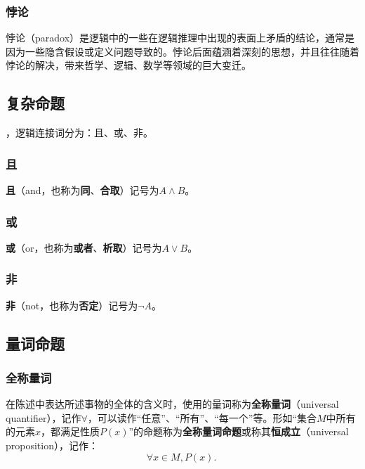 \subsubsection{悖论}

悖论（paradox）是逻辑中的一些在逻辑推理中出现的表面上矛盾的结论，通常是因为一些隐含假设或定义问题导致的。悖论后面蕴涵着深刻的思想，并且往往随着悖论的解决，带来哲学、逻辑、数学等领域的巨大变迁。

\subsection{复杂命题}\label{sub_HsLogi_1}

，逻辑连接词分为：且、或、非。

\subsubsection{且}

\textbf{且}（and，也称为\textbf{同}、\textbf{合取}）记号为$A\land B$。

\subsubsection{或}

\textbf{或}（or，也称为\textbf{或者}、\textbf{析取}）记号为$A\lor B$。


\subsubsection{非}
\textbf{非}（not，也称为\textbf{否定}）记号为$\lnot A$。

\subsection{量词命题}

\subsubsection{全称量词}

在陈述中表达所述事物的全体的含义时，使用的量词称为\textbf{全称量词}（universal quantifier），记作$\forall$，可以读作“任意”、“所有”、“每一个”等。形如“集合$M$中所有的元素$x$，都满足性质$P(x)$”的命题称为\textbf{全称量词命题}或称其\textbf{恒成立}（universal proposition），记作：
\begin{equation}
\forall x\in M,P(x).~
\end{equation}


